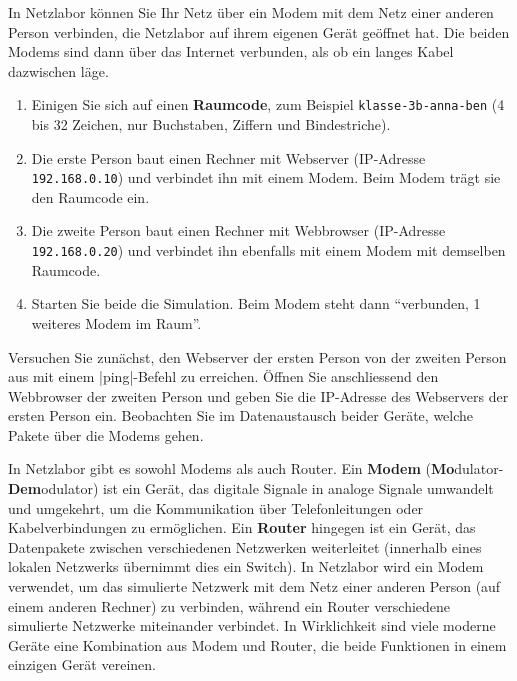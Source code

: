 \begin{mychallenge}
	In Netzlabor können Sie Ihr Netz über ein Modem mit dem Netz einer anderen Person verbinden, die Netzlabor auf ihrem eigenen Gerät geöffnet hat. Die beiden Modems sind dann über das Internet verbunden, als ob ein langes Kabel dazwischen läge.

	\begin{enumerate}
		\item Einigen Sie sich auf einen \textbf{Raumcode}, zum Beispiel \texttt{klasse-3b-anna-ben} (4 bis 32 Zeichen, nur Buchstaben, Ziffern und Bindestriche).
		\item Die erste Person baut einen Rechner mit Webserver (\gls{IP}-Adresse \texttt{192.168.0.10}) und verbindet ihn mit einem Modem. Beim Modem trägt sie den Raumcode ein.
		\item Die zweite Person baut einen Rechner mit Webbrowser (\gls{IP}-Adresse \texttt{192.168.0.20}) und verbindet ihn ebenfalls mit einem Modem mit demselben Raumcode.
		\item Starten Sie beide die Simulation. Beim Modem steht dann \enquote{verbunden, 1 weiteres Modem im Raum}.
	\end{enumerate}

	Versuchen Sie zunächst, den Webserver der ersten Person von der zweiten Person aus mit einem \commandbox*|ping|-Befehl zu erreichen. Öffnen Sie anschliessend den Webbrowser der zweiten Person und geben Sie die \gls{IP}-Adresse des Webservers der ersten Person ein. Beobachten Sie im Datenaustausch beider Geräte, welche Pakete über die Modems gehen.
\end{mychallenge}

\begin{myremark}
	In Netzlabor gibt es sowohl Modems als auch Router. Ein \textbf{Modem} (\textbf{Mo}dulator-\textbf{Dem}odulator) ist ein Gerät, das digitale Signale in analoge Signale umwandelt und umgekehrt, um die Kommunikation über Telefonleitungen oder Kabelverbindungen zu ermöglichen. Ein \textbf{Router} hingegen ist ein Gerät, das Datenpakete zwischen verschiedenen Netzwerken weiterleitet (innerhalb eines lokalen Netzwerks übernimmt dies ein Switch). In Netzlabor wird ein Modem verwendet, um das simulierte Netzwerk mit dem Netz einer anderen Person (auf einem anderen Rechner) zu verbinden, während ein Router verschiedene simulierte Netzwerke miteinander verbindet. In Wirklichkeit sind viele moderne Geräte eine Kombination aus Modem und Router, die beide Funktionen in einem einzigen Gerät vereinen.
\end{myremark}

